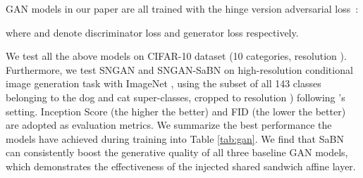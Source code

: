 \documentclass{article}
\begin{document}
GAN models in our paper are all trained with the hinge version adversarial loss~\cite{miyato2018spectral, brock2018large}:

where  and  denote discriminator loss and generator loss respectively.


\begin{table}[t!]
\caption{The best Inception Scores (``IS'', ) and FIDs () achieved by conditional SNGAN, BigGAN, and AutoGAN-top1, using CCBN and SaBN on CIFAR-10 and ImageNet (dogs \& cats).}
\label{tab:gan}
\footnotesize
\centering
{}
\end{table} 
We test all the above models on CIFAR-10 dataset \citep{krizhevsky2009learning} (10 categories, resolution ). Furthermore, we test SNGAN and SNGAN-SaBN on high-resolution conditional image generation task with ImageNet \citep{deng2009imagenet}, using the subset of all 143 classes belonging to the dog and cat super-classes, cropped to resolution ) following \citep{miyato2018spectral}'s setting. Inception Score \citep{salimans2016improved} (the higher the better) and FID \citep{heusel2017gans} (the lower the better) are adopted as evaluation metrics. We summarize the best performance the models have achieved during training into Table \ref{tab:gan}. We find that SaBN can consistently boost the generative quality of all three baseline GAN models, which demonstrates the effectiveness of the injected shared sandwich affine layer.
\end{document}
